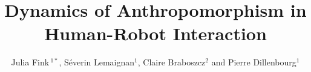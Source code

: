 \documentclass{frontiersSCNS} %
\def\firstAuthorLast{Fink {et~al.}} %
\def\Authors{Julia Fink\,$^{1*}$, S\'{e}verin Lemaignan$^{1}$, Claire Braboszcz$^{2}$ and Pierre Dillenbourg$^{1}$}
\begin{document}
\onecolumn
{}

\title[Dynamics of Anthropomorphism]{Dynamics of Anthropomorphism in Human-Robot Interaction}
\author[\firstAuthorLast ]{\Authors}
\address{}
\correspondance{}
\extraAuth{}


\maketitle


\begin{abstract}



\end{abstract}
\end{document}
